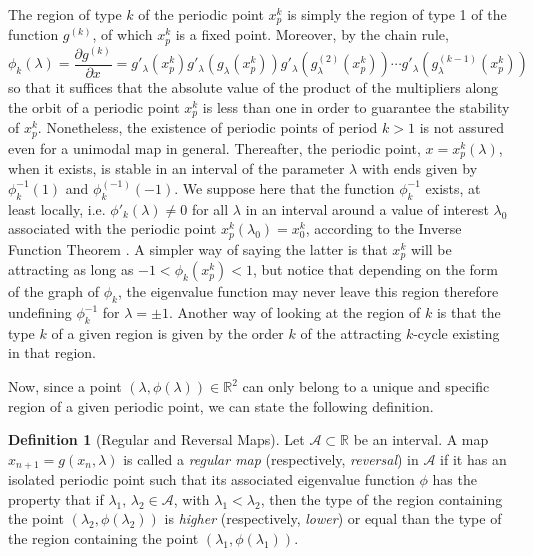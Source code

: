 \documentclass[10pt,twoside,titlepage]{book}
\numberwithin{equation}{chapter}
\numberwithin{figure}{chapter}
\numberwithin{table}{chapter}
\theoremstyle{plain}%
\theoremstyle{definition}
\newtheorem{defn}{Definition}[chapter]
\theoremstyle{remark}
\begin{document}
The region of type $k$ of the periodic point $x_{p}^{k}$ is simply the region of type 1 of the function $g^{(k)}$, of which $x_{p}^{k}$ is a fixed point. Moreover, by the chain rule,
\[\phi_{k}(\lambda)=\frac{\partial g^{(k)}}{\partial x}=g'_{\lambda}(x_{p}^{k})g'_{\lambda}(g_{\lambda}(x_{p}^{k}))g'_{\lambda}(g_{\lambda}^{(2)}(x_{p}^{k}))\cdots g'_{\lambda}(g_{\lambda}^{(k-1)}(x_{p}^{k}))\]
so that it suffices that the absolute value of the product of the multipliers along the orbit of a periodic point $x_{p}^{k}$ is less than one in order to guarantee the stability of $x_{p}^{k}$. Nonetheless, the existence of periodic points of period $k>1$ is not assured even for a unimodal map in general. Thereafter, the periodic point, $x=x_{p}^{k}(\lambda)$, when it exists, is stable in an interval of the parameter $\lambda$ with ends given by $\phi_{k}^{-1}(1)$ and $\phi_{k}^{(-1)}(-1)$. We suppose here that the function $\phi_{k}^{-1}$ exists, at least locally, i.e. $\phi'_{k}(\lambda)\neq0$ for all $\lambda$ in an interval around a value of interest $\lambda_0$ associated with the periodic point $x_p^k(\lambda_0)=x_0^k$, according to the Inverse Function Theorem \cite{Protter}. A simpler way of saying the latter is that $x_p^k$ will be attracting as long as $-1<\phi_k(x_p^k)<1$, but notice that depending on the form of the graph of $\phi_k$, the eigenvalue function may never leave this region therefore undefining $\phi_k^{-1}$ for $\lambda=\pm1$. Another way of looking at the region of $k$ is that the type $k$ of a given region is given by the order $k$ of the attracting $k$-cycle existing in that region.

Now, since a point $(\lambda,\phi(\lambda))\in\mathbb{R}^{2}$ can only belong to a unique and specific region of a given periodic point, we can state the following definition.

\begin{defn}[Regular and Reversal Maps]
	Let $\mathcal{A}\subset\mathbb{R}$ be an interval. A map $x_{n+1}=g(x_{n},\lambda)$ is called a \emph{regular map} (respectively, \emph{reversal}) in $\mathcal{A}$ if it has an isolated periodic point such that its associated eigenvalue function $\phi$ has the property that if $\lambda_{1},\,\lambda_{2}\in\mathcal{A}$, with $\lambda_{1}<\lambda_{2}$, then the type of the region containing the point $(\lambda_{2},\phi(\lambda_{2}))$ is \emph{higher} (respectively, \emph{lower}) or equal than the type of the region containing the point $(\lambda_{1},\phi(\lambda_{1}))$.
	\label{def:Regular&ReversalMaps}
\end{defn}
\end{document}
